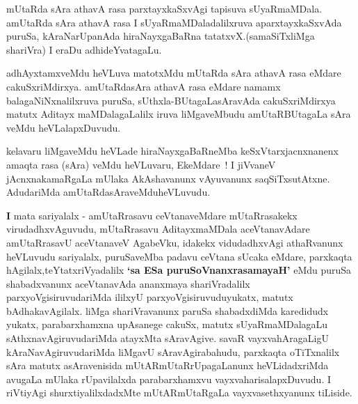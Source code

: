 \centerline{}

\begin{artha}
mUtaRda sAra athavA rasa parxtayxkaSxvAgi tapisuva sUyaRmaMDala.
amUtaRda sAra athavA rasa I sUyaRmaMDaladalilxruva aparxtayxkaSxvAda
puruSa, kAraNarUpanAda hiraNayxgaBaRna tatatxvX.(samaSiTxliMga shariVra)
I eraDu adhideYvatagaLu.

adhAyxtamxveMdu heVLuva matotxMdu mUtaRda sAra athavA rasa eMdare
cakuSxriMdirxya. amUtaRdasAra athavA rasa eMdare namamx
balagaNiNxnalilxruva puruSa, sUthxla-BUtagaLasAravAda cakuSxriMdirxya
matutx Aditayx maMDalagaLalilx iruva liMgaveMbudu amUtaRBUtagaLa sAra
veMdu heVLalapxDuvudu.
\end{artha}

\centerline{}

\begin{artha}
kelavaru liMgaveMdu heVLade hiraNayxgaBaRneMba keSxVtarxjacnxnanenx
amaqta rasa (sAra) veMdu heVLuvaru, EkeMdare~! I jiVvaneV
jAcnxnakamaRgaLa mUlaka AkAshavanunx vAyuvanunx
saqSiTxsutAtxne. AdudariMda amUtaRdasAraveMdu\break heVLuvudu.
\end{artha}

\begin{artha}
{\textbf I mata sariyalalx -} amUtaRrasavu ceVtanaveMdare
mUtaRrasakekx virudadhxvAguvudu, mUtaRrasavu AditayxmaMDala
aceVtanavAdare amUtaRrasavU aceVtanaveV AgabeVku, idakekx
vidudadhxvAgi athaRvanunx heVLuvudu sariyalalx, puruSaveMba padavu
ceVtana sUcaka eMdare, parxkaqta hAgilalx,teYtatxriVyadalilx \textbf{`sa ESa puruSoV\s nanxrasamayaH'}
eMdu puruSa shabadxvanunx aceVtanavAda ananxmaya shariVradalilx
parxyoVgisiruvudariMda ililxyU parxyoVgisiruvuduyukatx, matutx
bAdhakavAgilalx. liMga shariVravanunx paruSa shabadxdiMda karedidudx
yukatx, parabarxhamxna upAsanege cakuSx, matutx sUyaRmaMDalagaLu
sAthxnavAgiruvudariMda atayxMta sAravAgive. savaR vayxvahAragaLigU
kAraNavAgiruvudariMda liMgavU sAravAgirabahudu, parxkaqta oTiTxnalilx
sAra matutx asAravenisida mUtARmUtaRrUpagaLanunx heVLidadxriMda
avugaLa mUlaka rUpavilalxda parabarxhamxvu vayxvaharisalapxDu\-vudu. I riVtiyAgi shurxtiyalilxdadxMte mUtARmUtaRgaLa vayxvasethxyanunx tiLiside.
\end{artha}

\centerline{}
	

